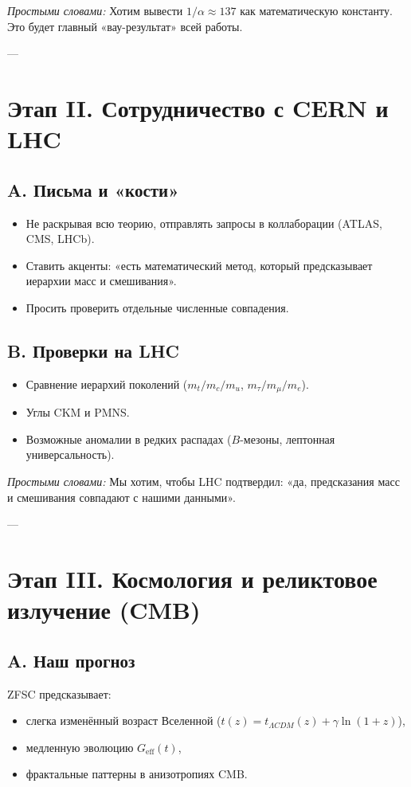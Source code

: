 \documentclass[a4paper,12pt]{article}
\begin{document}
\textit{Простыми словами:}  
Хотим вывести $1/\alpha \approx 137$ как математическую константу.  
Это будет главный «вау-результат» всей работы.

---

\section*{Этап II. Сотрудничество с CERN и LHC}
\subsection*{A. Письма и «кости»}
\begin{itemize}
  \item Не раскрывая всю теорию, отправлять запросы в коллаборации (ATLAS, CMS, LHCb).  
  \item Ставить акценты: «есть математический метод, который предсказывает иерархии масс и смешивания».  
  \item Просить проверить отдельные численные совпадения.
\end{itemize}

\subsection*{B. Проверки на LHC}
\begin{itemize}
  \item Сравнение иерархий поколений ($m_t/m_c/m_u$, $m_\tau/m_\mu/m_e$).
  \item Углы CKM и PMNS.  
  \item Возможные аномалии в редких распадах ($B$-мезоны, лептонная универсальность).
\end{itemize}

\textit{Простыми словами:}  
Мы хотим, чтобы LHC подтвердил: «да, предсказания масс и смешивания совпадают с нашими данными».

---

\section*{Этап III. Космология и реликтовое излучение (CMB)}
\subsection*{A. Наш прогноз}
ZFSC предсказывает:
\begin{itemize}
  \item слегка изменённый возраст Вселенной ($t(z) = t_{\Lambda CDM}(z) + \gamma\ln(1+z)$),
  \item медленную эволюцию $G_{\text{eff}}(t)$,
  \item фрактальные паттерны в анизотропиях CMB.
\end{itemize}
\end{document}
